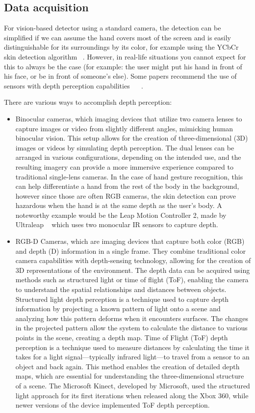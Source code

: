 \documentclass[12pt]{article}
\begin{document}
  \subsection{Data acquisition}

  For vision-based detector using a standard camera, the detection can be simplified if we can assume the hand covers most of the screen and is easily distinguishable for its surroundings by its color, for example using the YCbCr skin detection algorithm ~\cite{AIBINU20121183}.
  However, in real-life situations you cannot expect for this to always be the case (for example: the user might put his hand in front of his face, or be in front of someone's else). Some papers recommend the use of sensors with depth perception capabilities ~\cite{sahoo2022real} ~\cite{qi2024computer}.

  There are various ways to accomplish depth perception:
  \begin{itemize}
    \item Binocular cameras, which imaging devices that utilize two camera lenses to capture images or video from slightly different angles, mimicking human binocular vision. This setup allows for the creation of three-dimensional (3D) images or videos by simulating depth perception. The dual lenses can be arranged in various configurations, depending on the intended use, and the resulting imagery can provide a more immersive experience compared to traditional single-lens cameras. In the case of hand gesture recognition, this can help differentiate a hand from the rest of the body in the background, however since those are often RGB cameras, the skin detection can prove hazardous when the hand is at the same depth as the user's body. A noteworthy example would be the Leap Motion Controller 2, made by Ultraleap ~\cite{LEAPMOTION} which uses two monocular IR sensors to capture depth.
    \item RGB-D Cameras, which are imaging devices that capture both color (RGB) and depth (D) information in a single frame. They combine traditional color camera capabilities with depth-sensing technology, allowing for the creation of 3D representations of the environment. The depth data can be acquired using methods such as structured light or time of flight (ToF), enabling the camera to understand the spatial relationships and distances between objects. Structured light depth perception is a technique used to capture depth information by projecting a known pattern of light onto a scene and analyzing how this pattern deforms when it encounters surfaces. The changes in the projected pattern allow the system to calculate the distance to various points in the scene, creating a depth map. Time of Flight (ToF) depth perception is a technique used to measure distances by calculating the time it takes for a light signal—typically infrared light—to travel from a sensor to an object and back again. This method enables the creation of detailed depth maps, which are essential for understanding the three-dimensional structure of a scene. The Microsoft Kinect, developed by Microsoft, used the structured light approach for its first iterations when released along the Xbox 360, while newer versions of the device implemented ToF depth perception.
  \end{itemize}
\end{document}
